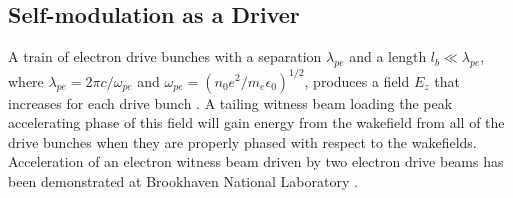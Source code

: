 \documentclass[aps,prstab,reprint,amsmath,amssymb,groupedaddress]{revtex4-1}
\begin{document}
\subsection[\label{S:I:SMI}]{Self-modulation as a Driver}

A train of electron drive bunches with a separation $\lambda_{pe}$ and a length $l_{b} \ll \lambda_{pe}$, where
$\lambda_{pe} = 2\pi c/\omega_{pe}$ and $\omega_{pe} = (n_{0} e^{2} / m_{e} \epsilon_{0})^{1/2}$,
produces a field $E_{z}$ that increases for each drive bunch \cite{chen:1985}. A tailing witness beam loading the
peak accelerating phase of this field will gain energy from the wakefield from all of the drive bunches when they are
properly phased with respect to the wakefields. Acceleration of an electron witness beam driven by two electron drive
beams has been demonstrated at Brookhaven National Laboratory \cite{muggli:2011}.
\end{document}
